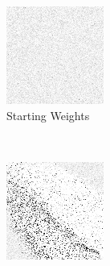 
\begin{figure}
\center

	\begin{subfigure}[t]{0.3\textwidth}
	\includegraphics[width=\textwidth]{images/findings/round1/flipbook_a.png}
	\caption{Starting Weights}
	\end{subfigure}
	~
	\begin{subfigure}[t]{0.3\textwidth}
	\includegraphics[width=\textwidth]{images/findings/round1/flipbook_b.png}

\end{subfigure}
\end{figure}
